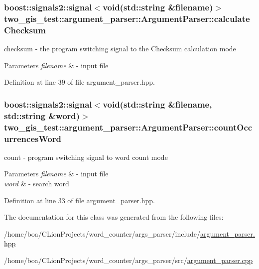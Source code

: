 \subsubsection[{\texorpdfstring{calculate\+Checksum}{calculateChecksum}}]{\setlength{\rightskip}{0pt plus 5cm}boost\+::signals2\+::signal$<$void(std\+::string \&filename)$>$ two\+\_\+gis\+\_\+test\+::argument\+\_\+parser\+::\+Argument\+Parser\+::calculate\+Checksum}\hypertarget{classtwo__gis__test_1_1argument__parser_1_1_argument_parser_ac02b2454df0eb6f127cadb0ccfdad67c}{}\label{classtwo__gis__test_1_1argument__parser_1_1_argument_parser_ac02b2454df0eb6f127cadb0ccfdad67c}


checksum -\/ the program switching signal to the Checksum calculation mode 


\begin{DoxyParams}{Parameters}
{\em filename} & -\/ input file \\
\hline
\end{DoxyParams}


Definition at line 39 of file argument\+\_\+parser.\+hpp.

\subsubsection[{\texorpdfstring{count\+Occurrences\+Word}{countOccurrencesWord}}]{\setlength{\rightskip}{0pt plus 5cm}boost\+::signals2\+::signal$<$void(std\+::string \&filename, std\+::string \&word)$>$ two\+\_\+gis\+\_\+test\+::argument\+\_\+parser\+::\+Argument\+Parser\+::count\+Occurrences\+Word}\hypertarget{classtwo__gis__test_1_1argument__parser_1_1_argument_parser_a9fdaea74b7ce00d7cc39c797745b9436}{}\label{classtwo__gis__test_1_1argument__parser_1_1_argument_parser_a9fdaea74b7ce00d7cc39c797745b9436}


count -\/ program switching signal to word count mode 


\begin{DoxyParams}{Parameters}
{\em filename} & -\/ input file \\
\hline
{\em word} & -\/ search word \\
\hline
\end{DoxyParams}


Definition at line 33 of file argument\+\_\+parser.\+hpp.



The documentation for this class was generated from the following files\+:\begin{DoxyCompactItemize}
\item 
/home/boa/\+C\+Lion\+Projects/word\+\_\+counter/args\+\_\+parser/include/\hyperlink{argument__parser_8hpp}{argument\+\_\+parser.\+hpp}\item 
/home/boa/\+C\+Lion\+Projects/word\+\_\+counter/args\+\_\+parser/src/\hyperlink{argument__parser_8cpp}{argument\+\_\+parser.\+cpp}\end{DoxyCompactItemize}

